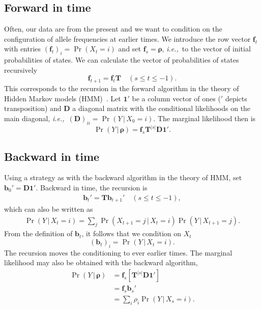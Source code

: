\documentclass[preprint]{elsarticle}
\newcommand{\bs}[1]{\ensuremath{\boldsymbol{#1}}}
\newcommand\given{{\,|\,}}
\newcommand\eg{{\it e.g.,}}
\newcommand\ie{{\it i.e.,}}
\newcommand\x[1]{\ensuremath{X_{#1}}}
\newcommand\y{\ensuremath{Y}}
\newcommand\s{\ensuremath{s}}
\newcommand\fv[1]{\ensuremath{\mathbf{f}_{#1}}}
\newcommand\bv[1]{\ensuremath{\mathbf{b}_{#1}}}
\newcommand\oneC{\ensuremath{\mathbf{1}'}}
\begin{document}
\subsection{Forward in time}

Often, our data are from the present and we want to condition on the configuration of allele frequencies at earlier times.  We introduce the row vector $\fv{t}$ with entries $(\fv{t})_{i} = \Pr(X_{t} = i)$ and set $\fv{\s} = \bs{\rho}$, \ie\ to the vector of initial probabilities of states. We can calculate the vector of probabilities of states recursively 
\begin{equation}
\fv{t+1} = \fv{t}\mathbf{T} \quad (\s \le t \le -1).
\end{equation}
This corresponds to the recursion in the forward algorithm in the theory of Hidden Markov models (HMM)~\citep[\eg][]{Vogl10}. Let $\oneC$ be a column vector of ones ($'$ depicts transposition) and $\mathbf{D}$ a diagonal matrix with the conditional likelihoods on the main diagonal, \ie\ $(\mathbf{D})_{ii}=\Pr(\y \given \x{0}=i)$. The marginal likelihood then is
\begin{equation}
\Pr(\y \given \bs{\rho}) = \fv{\s}\mathbf{T}^{|\s|}\mathbf{D}\oneC.
\end{equation}

\subsection{Backward in time}\label{section:backward}

Using a strategy as with the backward algorithm in the theory of HMM, set $\bv{0}'=\mathbf{D}\oneC$. Backward in time, the recursion is
\begin{equation}
\begin{split}
\bv{t}' = \mathbf{T} \bv{t+1}' \quad (\s \le t \le -1),
\end{split}
\end{equation}
which can also be written as
\begin{equation}\label{eq:backwards_discrete}
\begin{split}
\Pr(\y \given \x{t}=i) = \sum_j \Pr(\x{t+1}=j \given \x{t}=i) \Pr(\y \given \x{t+1}=j).
\end{split}
\end{equation}
From the definition of $\bv{t}$, it follows that we condition on $\x{t}$
\begin{equation}
(\bv{t})_{i} = \Pr(\y \given \x{t}=i).
\end{equation}
The recursion moves the conditioning to ever earlier times. The marginal likelihood may also be obtained with the backward algorithm,
\begin{equation}\label{eq:marg_lh}
\begin{split}
\Pr(\y \given \bs{\rho}) &= \fv{\s} \left[\mathbf{T}^{|\s|} \mathbf{D}\oneC\right]\\
                         &= \fv{\s} \bv{\s}' \\
                         &= \sum_i \rho_i \Pr(\y \given \x{\s}=i).
\end{split}
\end{equation}
\end{document}
